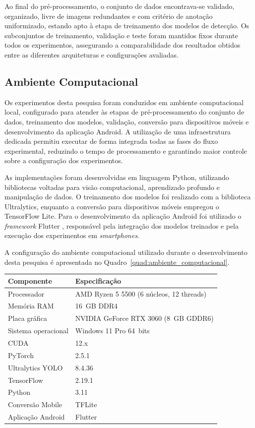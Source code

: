 \documentclass[artigo,times,capa]{iftex2024}
\begin{document}
Ao final do pré-processamento, o conjunto de dados encontrava-se validado,
organizado, livre de imagens redundantes e com critério de anotação
uniformizado, estando apto à etapa de treinamento dos modelos de detecção. Os
subconjuntos de treinamento, validação e teste foram mantidos fixos durante
todos os experimentos, assegurando a comparabilidade dos resultados obtidos
entre as diferentes arquiteturas e configurações avaliadas.

\subsection{Ambiente Computacional}

Os experimentos desta pesquisa foram conduzidos em ambiente computacional local, configurado para atender às etapas de pré-processamento do conjunto de dados, treinamento dos modelos, validação, conversão para dispositivos móveis e desenvolvimento da aplicação Android. A utilização de uma infraestrutura dedicada permitiu executar de forma integrada todas as fases do fluxo experimental, reduzindo o tempo de processamento e garantindo maior controle sobre a configuração dos experimentos.

As implementações foram desenvolvidas em linguagem Python, utilizando bibliotecas voltadas para visão computacional, aprendizado profundo e manipulação de dados. O treinamento dos modelos foi realizado com a biblioteca Ultralytics, enquanto a conversão para dispositivos móveis empregou o TensorFlow Lite. Para o desenvolvimento da aplicação Android foi utilizado o \textit{framework} Flutter \cite{Flutter2024}, responsável pela integração dos modelos treinados e pela execução dos experimentos em \textit{smartphones}.

A configuração do ambiente computacional utilizado durante o desenvolvimento desta pesquisa é apresentada no Quadro~\ref{quad:ambiente_computacional}.

\begin{board}[htbp]
\centering
\caption{Configuração do ambiente computacional utilizado no desenvolvimento do trabalho}
\label{quad:ambiente_computacional}
\begin{tabular}{ll}
\toprule
\textbf{Componente} & \textbf{Especificação} \\
\midrule
Processador & AMD Ryzen 5 5500 (6 núcleos, 12 threads) \\
Memória RAM & 16~GB DDR4 \\
Placa gráfica & NVIDIA GeForce RTX 3060 (8~GB GDDR6) \\
Sistema operacional & Windows 11 Pro 64~bits \\
CUDA & 12.x \\
PyTorch & 2.5.1 \\
Ultralytics \ac{YOLO} & 8.4.36 \\
TensorFlow & 2.19.1 \\
Python & 3.11 \\
Conversão Mobile & \ac{TFLite} \\
Aplicação Android & Flutter \\
\bottomrule
\end{tabular}
\end{board}
\end{document}
